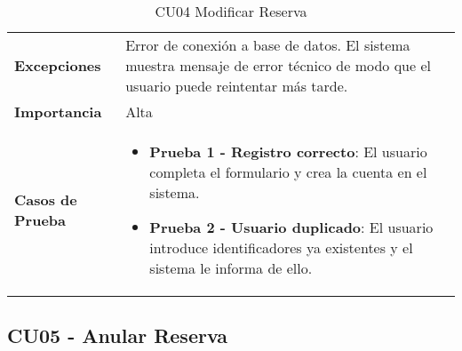 \begin{table}[H]
\begin{tabularx}{\linewidth}{ p{} p{} }
		\textbf{Excepciones}          & Error de conexión a base de datos. El sistema muestra mensaje de error técnico de modo que el usuario puede reintentar más tarde.\\
		\textbf{Importancia}          & Alta \\
		\textbf{Casos de Prueba}      &
		\begin{itemize}
			\item \textbf{Prueba 1 - Registro correcto}: El usuario completa el formulario y crea la cuenta en el sistema.
			\item \textbf{Prueba 2 - Usuario duplicado}: El usuario introduce identificadores ya existentes y el sistema le informa de ello.
		\end{itemize} \\
		\bottomrule
	\end{tabularx}
	\caption{CU04 Modificar Reserva}
	\label{cu:modificar-reserva}
\end{table}

\subsection{CU05 - Anular Reserva}


